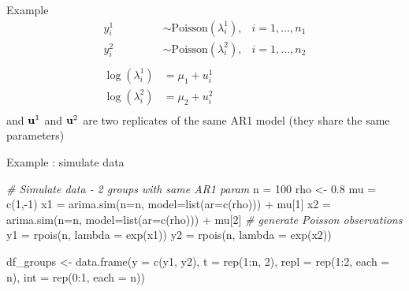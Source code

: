 \documentclass[
  ignorenonframetext,
  handout]{beamer}
\newenvironment{Shaded}{\begin{snugshade}}{\end{snugshade}}
\newcommand{\AttributeTok}[1]{\textcolor[rgb]{0.77,0.63,0.00}{#1}}
\newcommand{\CommentTok}[1]{\textcolor[rgb]{0.56,0.35,0.01}{\textit{#1}}}
\newcommand{\DecValTok}[1]{\textcolor[rgb]{0.00,0.00,0.81}{#1}}
\newcommand{\FloatTok}[1]{\textcolor[rgb]{0.00,0.00,0.81}{#1}}
\newcommand{\FunctionTok}[1]{\textcolor[rgb]{0.00,0.00,0.00}{#1}}
\newcommand{\NormalTok}[1]{#1}
\newcommand{\OtherTok}[1]{\textcolor[rgb]{0.56,0.35,0.01}{#1}}
\newcommand{\SpecialCharTok}[1]{\textcolor[rgb]{0.00,0.00,0.00}{#1}}
\begin{document}
\begin{frame}{Example}
\protect\hypertarget{example}{}
\[
\begin{aligned}
y^1_i & \sim\text{Poisson}(\lambda^1_i), & i = 1,\dots,n_1\\
y^2_i & \sim\text{Poisson}(\lambda^2_i), & i = 1,\dots,n_2\\
\\
\log(\lambda^1_i) & = \mu_1 + u^1_i\\
\log(\lambda^2_i)  & = \mu_2 + u^2_i\\
\end{aligned}
\] and \({\bf u}^1\) and \({\bf u}^2\) are two replicates of the same
AR1 model (they share the same parameters)
\end{frame}

\begin{frame}[fragile]{Example : simulate data}
\protect\hypertarget{example-simulate-data}{}
\footnotesize

\begin{Shaded}
\begin{Highlighting}[]
\CommentTok{\# Simulate data {-} 2 groups with same AR1 param}
\NormalTok{n }\OtherTok{=} \DecValTok{100}
\NormalTok{rho }\OtherTok{\textless{}{-}} \FloatTok{0.8}
\NormalTok{mu }\OtherTok{=} \FunctionTok{c}\NormalTok{(}\DecValTok{1}\NormalTok{,}\SpecialCharTok{{-}}\DecValTok{1}\NormalTok{)}
\NormalTok{x1 }\OtherTok{=} \FunctionTok{arima.sim}\NormalTok{(}\AttributeTok{n=}\NormalTok{n, }\AttributeTok{model=}\FunctionTok{list}\NormalTok{(}\AttributeTok{ar=}\FunctionTok{c}\NormalTok{(rho))) }\SpecialCharTok{+}\NormalTok{ mu[}\DecValTok{1}\NormalTok{]}
\NormalTok{x2 }\OtherTok{=} \FunctionTok{arima.sim}\NormalTok{(}\AttributeTok{n=}\NormalTok{n, }\AttributeTok{model=}\FunctionTok{list}\NormalTok{(}\AttributeTok{ar=}\FunctionTok{c}\NormalTok{(rho))) }\SpecialCharTok{+}\NormalTok{ mu[}\DecValTok{2}\NormalTok{]}
\CommentTok{\# generate Poisson observations}
\NormalTok{y1 }\OtherTok{=} \FunctionTok{rpois}\NormalTok{(n, }\AttributeTok{lambda =} \FunctionTok{exp}\NormalTok{(x1))}
\NormalTok{y2 }\OtherTok{=} \FunctionTok{rpois}\NormalTok{(n, }\AttributeTok{lambda =} \FunctionTok{exp}\NormalTok{(x2))}

\NormalTok{df\_groups }\OtherTok{\textless{}{-}} \FunctionTok{data.frame}\NormalTok{(}\AttributeTok{y =} \FunctionTok{c}\NormalTok{(y1, y2),}
                        \AttributeTok{t =} \FunctionTok{rep}\NormalTok{(}\DecValTok{1}\SpecialCharTok{:}\NormalTok{n, }\DecValTok{2}\NormalTok{),}
                        \AttributeTok{repl =} \FunctionTok{rep}\NormalTok{(}\DecValTok{1}\SpecialCharTok{:}\DecValTok{2}\NormalTok{, }\AttributeTok{each =}\NormalTok{ n),}
                        \AttributeTok{int =} \FunctionTok{rep}\NormalTok{(}\DecValTok{0}\SpecialCharTok{:}\DecValTok{1}\NormalTok{, }\AttributeTok{each =}\NormalTok{ n))}
\end{Highlighting}
\end{Shaded}
\end{frame}
\end{document}
